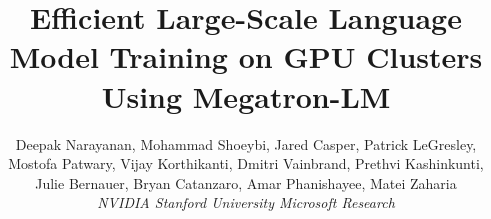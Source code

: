 \documentclass[sigconf,nonacm]{acmart}
\title{Efficient Large-Scale Language Model Training on GPU Clusters Using Megatron-LM}
\author{
\rm{Deepak Narayanan\stanford\ack, Mohammad Shoeybi\nv, Jared Casper\nv, Patrick LeGresley\nv, \\ Mostofa Patwary\nv, Vijay Korthikanti\nv, Dmitri Vainbrand\nv, Prethvi Kashinkunti\nv, \\ Julie Bernauer\nv, Bryan Catanzaro\nv, Amar Phanishayee\msr, Matei Zaharia\stanford}
\\
\rm{\textit{\nv NVIDIA\hspace{0.02in} \stanford Stanford University\hspace{0.02in} \msr Microsoft Research}}
}
\begin{document}


\maketitle

\renewcommand{\shortauthors}{}











\newpage



\end{document}
